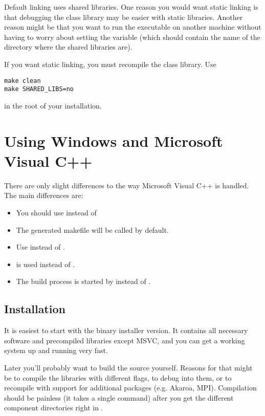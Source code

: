 Default linking uses shared libraries. One
reason you would want static linking is that debugging
the {\opp} class library may be easier with static libraries.
Another reason might be that you want to run the executable on
another machine without having to worry about setting the
 variable (which should contain the name
of the directory where the {\opp} shared libraries are).

If you want static linking, you must
recompile the {\opp} class library. Use

\begin{verbatim}
make clean
make SHARED_LIBS=no
\end{verbatim}

in the root of your {\opp} installation.

\section{Using Windows and Microsoft Visual C++}

There are only slight differences to the way Microsoft Visual C++
is handled. The main differences are:
\begin{itemize}
  \item{You should use  instead of }
  \item{The generated makefile will be called  by default.}
  \item{Use  instead of .}
  \item{ is used instead of .}
  \item{The build process is started by  instead of .}
\end{itemize}

\subsection{Installation}

It is easiest to start with the binary installer version.
It contains all necessary software and precompiled
libraries except MSVC, and you can get a
working system up and running very fast.

Later you'll probably want to build the source yourself.
Reasons for that might be to compile the libraries
with different flags, to debug into them, or to recompile
with support for additional packages (e.g. Akaroa, MPI).
Compilation should be painless (it takes a single
 command) after you get the different
component directories right in .


